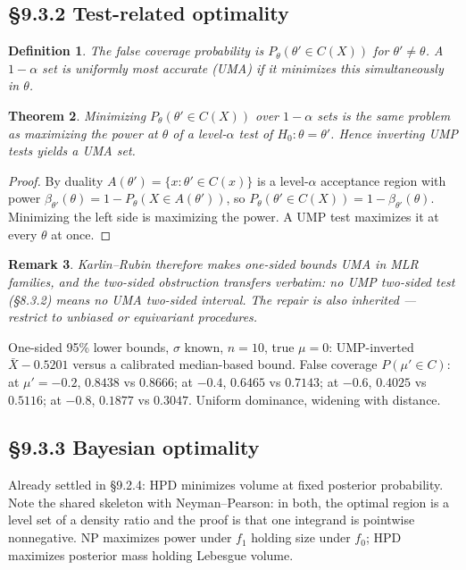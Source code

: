 \documentclass[11pt]{article}
\newtheorem{theorem}{Theorem}[section]
\newtheorem{definition}[theorem]{Definition}
\newtheorem{remark}[theorem]{Remark}
\begin{document}
\subsection{\S9.3.2 Test-related optimality}
\begin{definition}
The false coverage probability is $P_\theta(\theta'\in C(X))$ for $\theta'\ne\theta$. A $1-\alpha$ set is uniformly most accurate (UMA) if it minimizes this simultaneously in $\theta$.
\end{definition}
\begin{theorem}
Minimizing $P_\theta(\theta'\in C(X))$ over $1-\alpha$ sets is the same problem as maximizing the power at $\theta$ of a level-$\alpha$ test of $H_0:\theta=\theta'$. Hence inverting UMP tests yields a UMA set.
\end{theorem}
\begin{proof}
By duality $A(\theta')=\{x:\theta'\in C(x)\}$ is a level-$\alpha$ acceptance region with power $\beta_{\theta'}(\theta)=1-P_\theta(X\in A(\theta'))$, so $P_\theta(\theta'\in C(X))=1-\beta_{\theta'}(\theta)$. Minimizing the left side is maximizing the power. A UMP test maximizes it at every $\theta$ at once.
\end{proof}
\begin{remark}
Karlin--Rubin therefore makes one-sided bounds UMA in MLR families, and the two-sided obstruction transfers verbatim: no UMP two-sided test (\S8.3.2) means no UMA two-sided interval. The repair is also inherited --- restrict to unbiased or equivariant procedures.
\end{remark}
\begin{simbox}
One-sided 95\% lower bounds, $\sigma$ known, $n=10$, true $\mu=0$: UMP-inverted $\bar X-0.5201$ versus a calibrated median-based bound. False coverage $P(\mu'\in C)$: at $\mu'=-0.2$, $0.8438$ vs $0.8666$; at $-0.4$, $0.6465$ vs $0.7143$; at $-0.6$, $0.4025$ vs $0.5116$; at $-0.8$, $0.1877$ vs $0.3047$. Uniform dominance, widening with distance.
\end{simbox}

\subsection{\S9.3.3 Bayesian optimality}
Already settled in \S9.2.4: HPD minimizes volume at fixed posterior probability. Note the shared skeleton with Neyman--Pearson: in both, the optimal region is a level set of a density ratio and the proof is that one integrand is pointwise nonnegative. NP maximizes power under $f_1$ holding size under $f_0$; HPD maximizes posterior mass holding Lebesgue volume.
\end{document}
